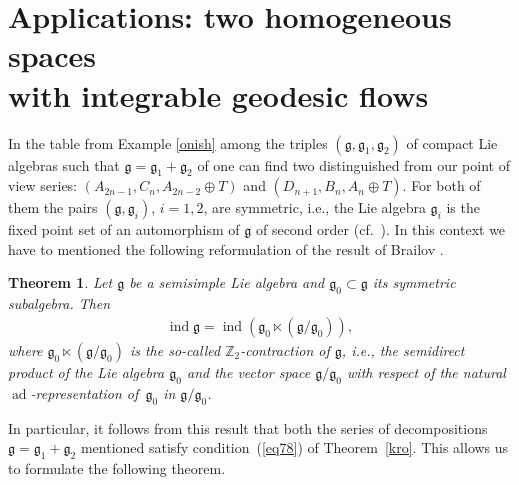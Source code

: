 \documentclass[10pt,a4paper]{amsart}
\numberwithin{equation}{section}
\newtheorem{Theorem}{Theorem}[section]
\begin{document}
\section[Applications: two homogeneous spaces with integrable geodesic flows]{Applications: two homogeneous spaces\\ with integrable geodesic flows}\label{s.appl}

In the table from Example \ref{onish} among the triples $(\mathfrak{g},\mathfrak{g}_1,\mathfrak{g}_2)$ of compact Lie algebras such that $\mathfrak{g}=\mathfrak{g}_1+\mathfrak{g}_2$ of one can find two distinguished from our point of view series: $(A_{2n-1},C_n,A_{2n-2}\oplus T)$ and $(D_{n+1},B_n,A_n\oplus T)$. For both of them the pairs $(\mathfrak{g},\mathfrak{g}_i)$, $i=1,2$, are symmetric, i.e., the Lie algebra $\mathfrak{g}_i$ is the fixed point set of an automorphism of $\mathfrak{g}$ of second order (cf.\ \cite[Tables II, III, Section~6, Chapter~X]{helgason}). In this context we have to mentioned the following reformulation of the result of Brailov \cite[Theorem~5, Section~37]{TFbols}.

\begin{Theorem}\label{brailov} Let $\mathfrak{g}$ be a semisimple Lie algebra and $\mathfrak{g}_0 \subset\mathfrak{g}$ its symmetric subalgebra. Then \begin{gather*}
\operatorname{ind} \mathfrak{g}=\operatorname{ind} (\mathfrak{g}_0\ltimes(\mathfrak{g}/\mathfrak{g}_0)),
\end{gather*}
where $\mathfrak{g}_0\ltimes(\mathfrak{g}/\mathfrak{g}_0)$ is the so-called $\mathbb{Z}_2$-contraction of $\mathfrak{g}$, i.e., the semidirect product of the Lie algebra $\mathfrak{g}_0$ and the vector space $\mathfrak{g}/\mathfrak{g}_0$ with respect of the natural $\operatorname{ad}$-representation of~$\mathfrak{g}_0$ in $\mathfrak{g}/\mathfrak{g}_0$.
\end{Theorem}
In particular, it follows from this result that both the series of decompositions $\mathfrak{g}=\mathfrak{g}_1+\mathfrak{g}_2$ mentioned satisfy condition~(\ref{eq78}) of Theorem~\ref{kro}. This allows us to formulate the following theorem.
\end{document}
